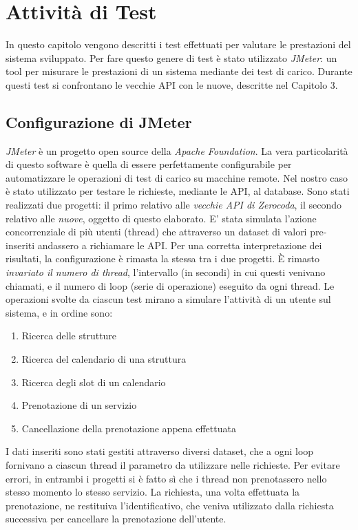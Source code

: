 \chapter{Attività di Test}
\label{chap:testing}
In questo capitolo vengono descritti i test effettuati per valutare le prestazioni del sistema sviluppato. Per fare questo genere di test è stato utilizzato \emph{JMeter}: un tool per misurare le prestazioni di un sistema mediante dei test di carico. Durante questi test si confrontano le vecchie API con le nuove, descritte nel Capitolo 3.

\section{Configurazione di JMeter}
\emph{JMeter} è un progetto open source della \emph{Apache Foundation}. La vera particolarità di questo software è quella di essere perfettamente configurabile per automatizzare le operazioni di test di carico su macchine remote. Nel nostro caso è stato utilizzato per testare le richieste, mediante le API, al database. Sono stati realizzati due progetti: il primo relativo alle \textit{vecchie API di Zerocoda}, il secondo relativo alle \textit{nuove}, oggetto di questo elaborato. E' stata simulata l'azione concorrenziale di più utenti (thread) che attraverso un dataset di valori pre-inseriti andassero a richiamare le API. Per una corretta interpretazione dei risultati, la configurazione è rimasta la stessa tra i due progetti. È rimasto \textit{invariato il numero di thread}, l'intervallo (in secondi) in cui questi venivano chiamati, e il numero di loop (serie di operazione) eseguito da ogni thread. Le operazioni svolte da ciascun test mirano a simulare l'attività di un utente sul sistema, e in ordine sono:
\begin{enumerate}
    \item Ricerca delle strutture
    \item Ricerca del calendario di una struttura
    \item Ricerca degli slot di un calendario
    \item Prenotazione di un servizio
    \item Cancellazione della prenotazione appena effettuata
\end{enumerate}
I dati inseriti sono stati gestiti attraverso diversi dataset, che a ogni loop fornivano a ciascun thread il parametro da utilizzare nelle richieste. Per evitare errori, in entrambi i progetti si è fatto sì che i thread non prenotassero nello stesso momento lo stesso servizio. La richiesta, una volta effettuata la prenotazione, ne restituiva l'identificativo, che veniva utilizzato dalla richiesta successiva per cancellare la prenotazione dell'utente.

